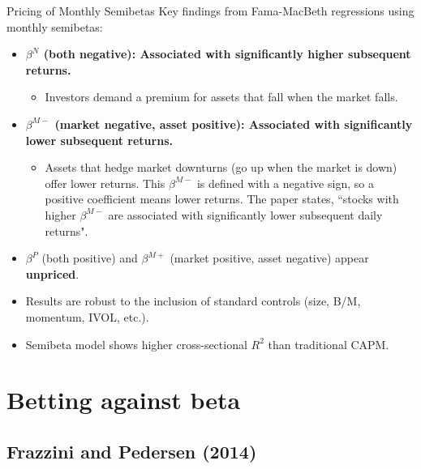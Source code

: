 \documentclass[10pt]{beamer}
\begin{document}
\begin{frame}{Pricing of Monthly Semibetas}
  Key findings from Fama-MacBeth regressions using monthly semibetas:
  \begin{itemize}
    \item \textbf{$\beta^N$ (both negative): Associated with significantly higher subsequent returns.}
    \begin{itemize}
        \item Investors demand a premium for assets that fall when the market falls.
    \end{itemize}
    \item \textbf{$\beta^{M-}$ (market negative, asset positive): Associated with significantly lower subsequent returns.}
    \begin{itemize}
        \item Assets that hedge market downturns (go up when the market is down) offer lower returns. This $\beta^{M-}$ is defined with a negative sign, so a positive coefficient means lower returns. The paper states, ``stocks with higher $\beta^{M-}$ are associated with significantly lower subsequent daily returns".
    \end{itemize}
    \item $\beta^P$ (both positive) and $\beta^{M+}$ (market positive, asset negative) appear \textbf{unpriced}.
    \item Results are robust to the inclusion of standard controls (size, B/M, momentum, IVOL, etc.).
    \item Semibeta model shows higher cross-sectional $R^2$ than traditional CAPM.
  \end{itemize}
\end{frame}

\section{Betting against beta}

\subsection{Frazzini and Pedersen (2014)}
\end{document}
